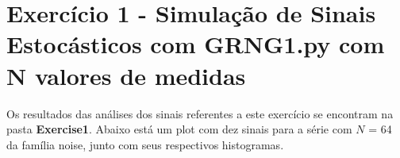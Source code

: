 
\section*{\large Exercício 1 - Simulação de Sinais Estocásticos com GRNG1.py com N valores de medidas}
%

Os resultados das análises dos sinais referentes a este exercício se encontram na pasta \textbf{Exercise1}. Abaixo está um plot com dez sinais para a série com $N$ = 64 da família noise, junto com seus respectivos histogramas.

\begin{figure}[ht!]
	\vspace{0mm}	%
	\begin{center}
	\end{center}
	\vspace{-2mm}	%
	\label{ex1_fig1}
\end{figure}

